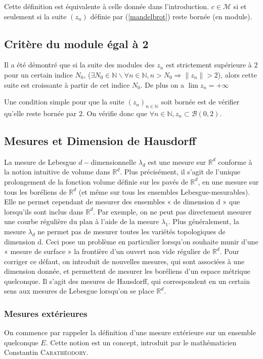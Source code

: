 \documentclass[12pt,a4paper]{article}
\theoremstyle{plain}
\theoremstyle{plain}
\theoremstyle{definition}
\theoremstyle{remark}
\begin{document}
Cette définition est équivalente à celle donnée dans l'introduction. $c \in \mathcal{M}$ si et seulement si la suite $(z_n)$ définie par (\ref{mandelbrot}) reste bornée (en module).

	\subsection{Critère du module égal à 2}
Il a été démontré que si la suite des modules des $z_n$ est strictement supérieure à $2$ pour un certain indice $N_0$,
($\exists N_0 \in \mathbb{N} \backslash \forall n \in \mathbb{N},{} n>N_0 \Longrightarrow \|z_n\|>2$), alors cette suite est croissante à partir de cet indice $N_0$. De plus on a $\lim z_n = +\infty$

Une condition simple pour que la suite $(z_n)_{n \in \mathbb{N}}$ soit bornée est de vérifier qu'elle reste bornée par $2$. On vérifie donc que $\forall n \in \mathbb{N}, z_n \subset \mathcal{B}(0,2)$.

	\subsection{Mesures et Dimension de Hausdorff}
La mesure de Lebesgue $d-$dimensionnelle $\lambda_d$ est une mesure sur $\mathbb{R}^d$ conforme à la notion intuitive de volume dans $\mathbb{R}^d$. Plus précisément, il s’agit de l’unique prolongement de la fonction volume définie sur les pavés de $\mathbb{R}^d$, en une mesure sur tous les boréliens de $\mathbb{R}^d$ (et même sur tous les ensembles Lebesgue-mesurables). Elle ne permet cependant de mesurer des ensembles « de dimension d » que lorsqu’ils sont inclus dans $\mathbb{R}^d$. Par exemple, on ne peut pas directement mesurer une courbe régulière du plan à l’aide de la mesure $\lambda_1$. Plus généralement, la mesure $\lambda_d$ ne permet pas de mesurer toutes les variétés topologiques de dimension d. Ceci pose un problème en particulier lorsqu’on souhaite munir d’une « mesure de surface » la
frontière d’un ouvert non vide régulier de $\mathbb{R}^d$.
Pour corriger ce défaut, on introduit de nouvelles mesures, qui sont associées à une dimension donnée, et permettent de mesurer les boréliens d’un espace métrique quelconque. Il s’agit des mesures de Hausdorff, qui correspondent en un certain 
sens aux mesures de Lebesgue lorsqu’on se place $\mathbb{R}^d$.
	\subsubsection{Mesures extérieures}
On commence par rappeler la définition d'une mesure extérieure sur un ensemble quelconque $E$. Cette notion est un concept, introduit par le mathématicien Constantin \textsc{Carathéodory}. 
\end{document}
